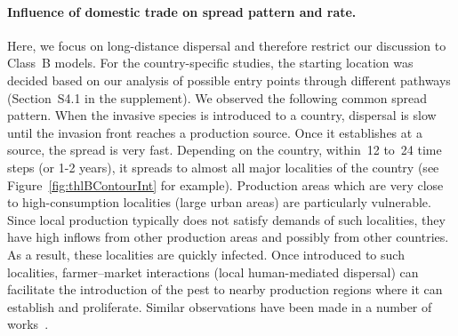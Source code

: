 \documentclass[11pt]{article}
\theoremstyle{definition}
\begin{document}
\paragraph{Influence of domestic trade on spread pattern and rate.}
Here, we focus on long-distance dispersal and therefore restrict our
discussion to Class~B models. For the country-specific studies, the
starting location was decided based on our analysis of possible entry
points through different pathways (Section~S4.1 in the
supplement).  We observed the following common spread pattern.  When the
invasive species is introduced to a country, dispersal is slow until the
invasion front reaches a {production source}. Once it establishes at a
source, the spread is very fast.  Depending on the country, within~12 to~24
time steps (or 1-2 years), it spreads to almost all major localities of
the country (see Figure~\ref{fig:thlBContourInt} for example). Production
areas which are very close to high-consumption localities (large urban
areas) are particularly vulnerable. Since local production typically does
not satisfy demands of such localities, they have high inflows from other
production areas and possibly from other countries. As a result, these
localities are quickly infected. Once introduced to such localities,
farmer--market interactions (local human-mediated dispersal) can facilitate
the introduction of the pest to nearby production regions where it can
establish and proliferate. Similar observations have been made in a number
of works~\cite{kiss2006network,pautasso2010disease}.
\end{document}
